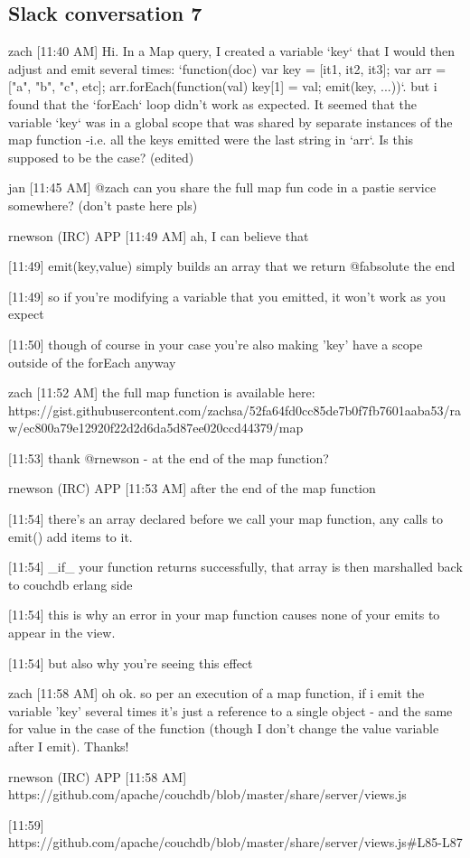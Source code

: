 \subsection{Slack conversation 7}
\label{appendix:slack7}
zach [11:40 AM]
Hi. In a Map query, I created a variable `key` that I would then adjust and emit several times: `function(doc) {var key = [it1, it2, it3]; var arr = ["a", "b", "c", etc]; arr.forEach(function(val) {key[1] = val; emit(key, ...)})}`. but i found that the `forEach` loop didn't work as expected. It seemed that the variable `key` was in a global scope that was shared by separate instances of the map function -i.e. all the keys emitted were the last string in `arr`. Is this supposed to be the case? (edited)

jan [11:45 AM]
@zach can you share the full map fun code in a pastie service somewhere? (don’t paste here pls)

rnewson (IRC) APP [11:49 AM]
ah, I can believe that

    [11:49]
emit(key,value) simply builds an array that we return @fabsolute the end

    [11:49]
so if you're modifying a variable that you emitted, it won't work as you expect

    [11:50]
though of course in your case you're also making 'key' have a scope outside of the forEach anyway

zach [11:52 AM]
the full map function is available here: https://gist.githubusercontent.com/zachsa/52fa64fd0cc85de7b0f7fb7601aaba53/raw/ec800a79e12920f22d2d6da5d87ee020ccd44379/map%

[11:53]
thank @rnewson - at the end of the map function?

rnewson (IRC) APP [11:53 AM]
after the end of the map function

    [11:54]
there's an array declared before we call your map function, any calls to emit() add items to it.

[11:54]
_if_ your function returns successfully, that array is then marshalled back to couchdb erlang side

    [11:54]
this is why an error in your map function causes none of your emits to appear in the view.

[11:54]
but also why you're seeing this effect

zach [11:58 AM]
oh ok. so per an execution of a map function, if i emit the variable 'key' several times it's just a reference to a single object - and the same for value in the case of the function (though I don't change the value variable after I emit). Thanks!

rnewson (IRC) APP [11:58 AM]
https://github.com/apache/couchdb/blob/master/share/server/views.js

[11:59]
https://github.com/apache/couchdb/blob/master/share/server/views.js#L85-L87